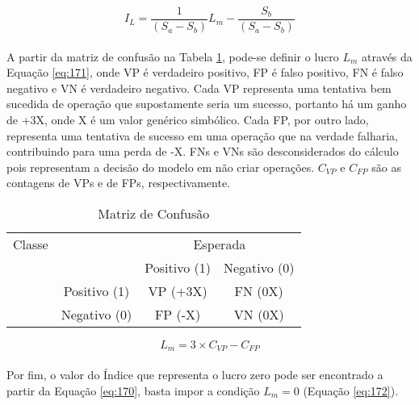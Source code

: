 \begin{equation} \label{eq:170}
    I_{L} = \dfrac{1}{(S_a - S_b)}L_m - \dfrac{S_b}{(S_a - S_b)}
\end{equation}

\paragraph{} A partir da matriz de confusão na Tabela \ref{tab:672}, pode-se definir o lucro \begin{math} L_m \end{math} através da Equação \ref{eq:171}, onde VP é verdadeiro positivo, FP é falso positivo, FN é falso negativo e VN é verdadeiro negativo. Cada VP representa uma tentativa bem sucedida de operação que supostamente seria um sucesso, portanto há um ganho de +3X, onde X é um valor genérico simbólico. Cada FP, por outro lado, representa uma tentativa de sucesso em uma operação que na verdade falharia, contribuindo para uma perda de -X. FNs e VNs são desconsiderados do cálculo pois representam a decisão do modelo em não criar operações. \begin{math} C_{VP} \end{math} e \begin{math} C_{FP} \end{math} são as contagens de VPs e de FPs, respectivamente.

\begin{table}[h!]
    \begin{center}
        \begin{tabular}{ cc|c|c }
                Classe  & & \multicolumn{2}{c}{Esperada} \\
                        & & Positivo (1) & Negativo (0) \\
            \hline
            \parbox[t]{2mm}{} & Positivo (1) & VP (+3X) & FN (0X) \\
            & Negativo (0) & FP (-X) & VN (0X) \\
        \end{tabular}
        \caption{Matriz de Confusão}
        \label{tab:672}
    \end{center}
\end{table}


\begin{equation} \label{eq:171}
    L_m = 3 \times C_{VP} - C_{FP}
\end{equation}

\paragraph{} Por fim, o valor do Índice que representa o lucro zero pode ser encontrado a partir da Equação \ref{eq:170}, basta impor a condição \begin{math} L_m=0 \end{math} (Equação \ref{eq:172}).

